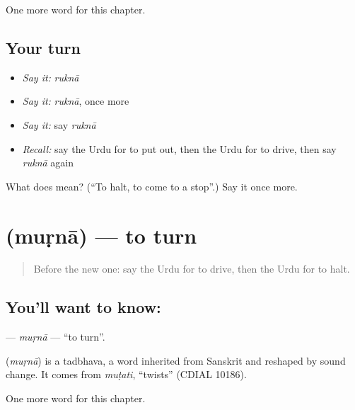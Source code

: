 \begin{grammarlens}[title={What you've built}]
One more word for this chapter.
\end{grammarlens}

\subsection*{Your turn}
\begin{itemize}
\raggedright
  \item \emph{Say it:} \emph{ruknā}
  \item \emph{Say it:} \emph{ruknā}, once more
  \item \emph{Say it:} say \emph{ruknā}
  \item \emph{Recall:} say the Urdu for to put out, then the Urdu for to drive, then say \emph{ruknā} again
\end{itemize}

\begin{tcolorbox}[breakable,colback=teal!4,colframe=teal!35!black,title={Before you move on}]
What does  mean? (\textquotedblleft{}To halt, to come to a stop\textquotedblright{}.) Say it once more.
\end{tcolorbox}
\section[\texorpdfstring{\ur{مڑنا} (muṛnā)}{مڑنا (muṛnā)}]{ (muṛnā) — to turn}

\label{lesson:UR-C240-murna}



\begin{quote}
Before the new one: say the Urdu for to drive, then the Urdu for to halt.
\end{quote}

\subsection*{You'll want to know: }
\textbf{} — \emph{muṛnā} — \textquotedblleft{}to turn\textquotedblright{}.

\begin{cousinweb}
\textbf{} (\emph{muṛnā}) is a tadbhava, a word inherited from Sanskrit and reshaped by sound change. It comes from \emph{muṭati}, \textquotedblleft{}twists\textquotedblright{} (CDIAL 10186).
\end{cousinweb}

\begin{grammarlens}[title={What you've built}]
One more word for this chapter.
\end{grammarlens}

